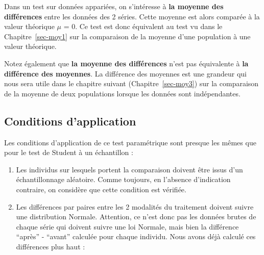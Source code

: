 \documentclass[
  a4paper,
  DIV=11,
  numbers=noendperiod,
  oneside]{scrreprt}
\providecommand{\tightlist}{%
  \setlength{\itemsep}{0pt}\setlength{\parskip}{0pt}}\usepackage{longtable,booktabs,array}
\begin{document}
\begin{tcolorbox}[enhanced jigsaw, breakable, toprule=.15mm, colbacktitle=quarto-callout-warning-color!10!white, colframe=quarto-callout-warning-color-frame, arc=.35mm, bottomtitle=1mm, opacityback=0, title=\textcolor{quarto-callout-warning-color}{\faExclamationTriangle}\hspace{0.5em}{Attention}, bottomrule=.15mm, colback=white, toptitle=1mm, rightrule=.15mm, leftrule=.75mm, opacitybacktitle=0.6, left=2mm, titlerule=0mm, coltitle=black]

Dans un test sur données appariées, on s'intéresse à \textbf{la moyenne
des différences} entre les données des 2 séries. Cette moyenne est alors
comparée à la valeur théorique \(\mu\) = 0. Ce test est donc équivalent
au test vu dans le Chapitre~\ref{sec-moy1} sur la comparaison de la
moyenne d'une population à une valeur théorique.

Notez également que \textbf{la moyenne des différences} n'est pas
équivalente à \textbf{la différence des moyennes}. La différence des
moyennes est une grandeur qui nous sera utile dans le chapitre suivant
(Chapitre~\ref{sec-moy3}) sur la comparaison de la moyenne de deux
populations lorsque les données sont indépendantes.

\end{tcolorbox}

\hypertarget{conditions-dapplication}{%
\subsection{Conditions d'application}\label{conditions-dapplication}}

Les conditions d'application de ce test paramétrique sont presque les
mêmes que pour le test de Student à un échantillon :

\begin{enumerate}
\def\labelenumi{\arabic{enumi}.}
\tightlist
\item
  Les individus sur lesquels portent la comparaison doivent être issus
  d'un échantillonnage aléatoire. Comme toujours, en l'absence
  d'indication contraire, on considère que cette condition est vérifiée.
\item
  Les différences par paires entre les 2 modalités du traitement doivent
  suivre une distribution Normale. Attention, ce n'est donc pas les
  données brutes de chaque série qui doivent suivre une loi Normale,
  mais bien la différence ``après'' - ``avant'' calculée pour chaque
  individu. Nous avons déjà calculé ces différences plus haut :
\end{enumerate}
\end{document}
